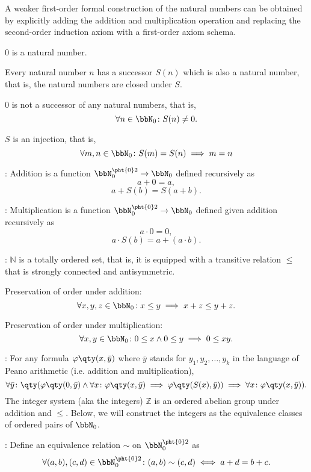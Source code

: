 \documentclass[a4paper,12pt]{report}
\begin{document}
\begin{itemizle}
A weaker first-order formal construction of the natural numbers can be obtained by explicitly adding the addition and multiplication operation and replacing the second-order induction axiom with a first-order axiom schema.
\bit
\item $0$ is a natural number.
\item Every natural number $n$ has a successor $S(n)$ which is also a natural number, that is, the natural numbers are closed under $S$.
\item $0$ is not a successor of any natural numbers, that is,
\[\forall n\in\bbN_0\colon S(n)\neq 0.\]
\item $S$ is an injection, that is,
\[\forall m,n\in\bbN_0\colon S(m)=S(n)\implies m=n\]
\item {}: Addition is a function $\bbN_0^{\pht{0}2}\to\bbN_0$ defined recursively as
\[a+0=a,\]
\[a+S(b)=S(a+b).\]
\item {}: Multiplication is a function $\bbN_0^{\pht{0}2}\to\bbN_0$ defined given addition recursively as
\[a\cdot 0=0,\]
\[a\cdot S(b)=a+(a\cdot b).\]
\item {}: $\mathbb{N}$ is a totally ordered set, that is, it is equipped with a transitive relation $\leq$ that is strongly connected and antisymmetric.
\bit
\item Preservation of order under addition:
\[\forall x,y,z\in\bbN_0\colon x\leq y\implies x+z\leq y+z.\]
\item Preservation of order under multiplication:
\[\forall x,y\in\bbN_0\colon 0\leq x\land 0\leq y\implies 0\leq xy.\]
\eit
\item {}: For any formula $\varphi\qty(x,\bar{y})$ where $\bar{y}$ stands for $y_1,y_2,\ldots,y_k$ in the language of Peano arithmetic (i.e. addition and multiplication),
\[\forall\bar{y}\colon\qty(\varphi\qty(0,\bar{y})\land\forall x\colon\varphi\qty(x,\bar{y})\implies\varphi\qty(S(x),\bar{y}))\implies\forall x\colon\varphi\qty(x,\bar{y})).\]
\eit
{}
The integer system (aka the integers) $\mathbb{Z}$ is an ordered abelian group under addition and $\leq$.
Below, we will construct the integers as the equivalence classes of ordered pairs of $\bbN_0$.
\bit
\item {}: Define an equivalence relation $\sim$ on $\bbN_0^{\pht{0}2}$ as
\[\forall(a,b),(c,d)\in\bbN_0^{\pht{0}2}\colon(a,b)\sim(c,d)\iff a+d=b+c.\]

\end{itemizle}
\end{document}
